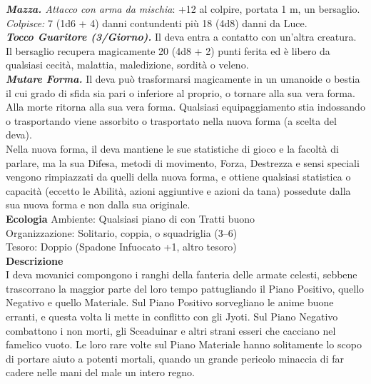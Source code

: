 \begin{multicols}{2}
\emph{\textbf{Mazza.} Attacco con arma da mischia}: +12 al colpire, portata 1 m, un bersaglio.\\ 
\emph{Colpisce:} 7 (1d6 + 4) danni contundenti più 18 (4d8) danni da Luce.\\
\emph{\textbf{Tocco Guaritore (3/Giorno).}} Il deva entra a contatto con un'altra creatura. Il bersaglio recupera magicamente 20 (4d8 + 2) punti ferita ed è libero da qualsiasi cecità, malattia, maledizione, sordità o veleno.\\
\emph{\textbf{Mutare Forma.}} Il deva può trasformarsi magicamente in un umanoide o bestia il cui grado di sfida sia pari o inferiore al proprio, o tornare alla sua vera forma. Alla morte ritorna alla sua vera forma. Qualsiasi equipaggiamento stia indossando o trasportando viene assorbito o trasportato nella nuova forma (a scelta del deva).\\
Nella nuova forma, il deva mantiene le sue statistiche di gioco e la facoltà di parlare, ma la sua Difesa, metodi di movimento, Forza, Destrezza e sensi speciali vengono rimpiazzati da quelli della nuova forma, e ottiene qualsiasi statistica o capacità (eccetto le Abilità, azioni aggiuntive e azioni da tana) possedute dalla sua nuova forma e non dalla sua originale.\\
\textbf{Ecologia}
Ambiente: Qualsiasi piano di con Tratti buono\\
Organizzazione: Solitario, coppia, o squadriglia (3–6)\\
Tesoro: Doppio (Spadone Infuocato +1, altro tesoro)\\
\textbf{Descrizione}\\
I deva movanici compongono i ranghi della fanteria delle armate celesti, sebbene trascorrano la maggior parte del loro tempo pattugliando il Piano Positivo, quello Negativo e quello Materiale. Sul Piano Positivo sorvegliano le anime buone erranti, e questa volta li mette in conflitto con gli Jyoti. Sul Piano Negativo combattono i non morti, gli Sceaduinar e altri strani esseri che cacciano nel famelico vuoto. Le loro rare volte sul Piano Materiale hanno solitamente lo scopo di portare aiuto a potenti mortali, quando un grande pericolo minaccia di far cadere nelle mani del male un intero regno.\\


\end{multicols}
